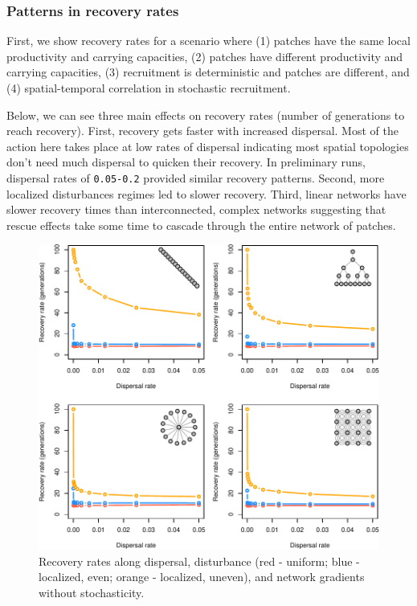 \documentclass[
]{article}
\begin{document}
\newpage

\hypertarget{patterns-in-recovery-rates}{%
\subsubsection{Patterns in recovery
rates}\label{patterns-in-recovery-rates}}

First, we show recovery rates for a scenario where (1) patches have the
same local productivity and carrying capacities, (2) patches have
different productivity and carrying capacities, (3) recruitment is
deterministic and patches are different, and (4) spatial-temporal
correlation in stochastic recruitment.

Below, we can see three main effects on recovery rates (number of
generations to reach recovery). First, recovery gets faster with
increased dispersal. Most of the action here takes place at low rates of
dispersal indicating most spatial topologies don't need much dispersal
to quicken their recovery. In preliminary runs, dispersal rates of
\texttt{0.05-0.2} provided similar recovery patterns. Second, more
localized disturbances regimes led to slower recovery. Third, linear
networks have slower recovery times than interconnected, complex
networks suggesting that rescue effects take some time to cascade
through the entire network of patches.

\begin{figure}[H]

{\centering \includegraphics{Managing_for_ecological_surprises_in_metapopulations_files/figure-latex/general results-1} 

}

\caption{Recovery rates along dispersal, disturbance (red - uniform; blue - localized, even; orange - localized, uneven), and network gradients without stochasticity.}\label{fig:general results}
\end{figure}
\newpage
\end{document}
